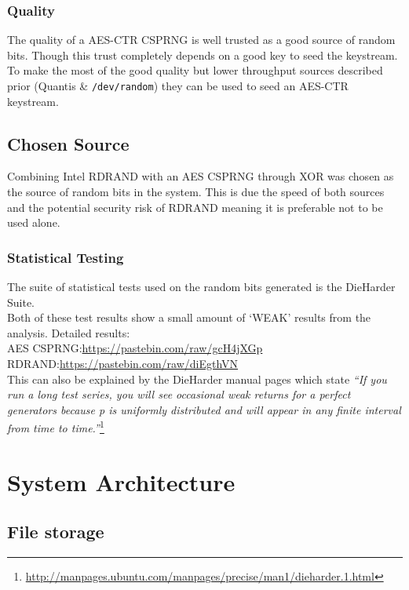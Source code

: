 \documentclass{paper}
\begin{document}
			\subsubsection{Quality}
				The quality of a AES-CTR CSPRNG is well trusted as a good source of random bits. Though this trust completely depends on a good key to seed the keystream.\\
				To make the most of the good quality but lower throughput sources described prior (Quantis \& \texttt{/dev/random}) they can be used to seed an AES-CTR keystream.\\
			
		\subsection{Chosen Source}
			Combining Intel RDRAND with an AES CSPRNG through XOR was chosen as the source of random bits in the system. This is due the speed of both sources and the potential security risk of RDRAND meaning it is preferable not to be used alone.
			\subsubsection{Statistical Testing}
			The suite of statistical tests used on the random bits generated is the DieHarder Suite.\\  
			Both of these test results show a small amount of `WEAK' results from the analysis. Detailed results:\\ 
			AES CSPRNG:\url{https://pastebin.com/raw/gcH4jXGp}\\ RDRAND:\url{https://pastebin.com/raw/diEgthVN}\\
			This can also be explained by the DieHarder manual pages which state \textit{``If you run a long test series, you will see occasional weak returns for a perfect generators because p is uniformly distributed and will appear in any finite interval from time to time.''}\footnote{\url{http://manpages.ubuntu.com/manpages/precise/man1/dieharder.1.html}}
		
		\section{System Architecture}
			\subsection{File storage}
\end{document}
